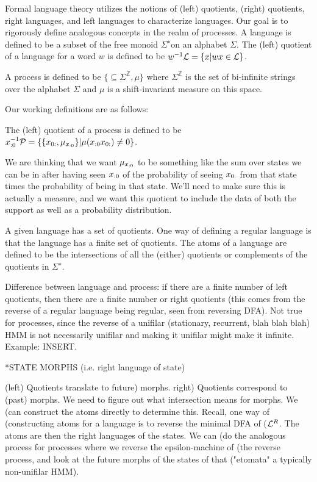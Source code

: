 \documentclass[prl,twocolumn,showpacs,superscriptaddress,preprintnumbers,floatfix]{revtex4-1}
\theoremstyle{plain}    \newtheorem{Lem}{Lemma}
\theoremstyle{plain}    \newtheorem*{ProLem}{Proof}
\theoremstyle{plain}    \newtheorem{Cor}{Corollary}
\theoremstyle{plain}    \newtheorem*{ProCor}{Proof}
\theoremstyle{plain}    \newtheorem{The}{Theorem}
\theoremstyle{plain}    \newtheorem*{ProThe}{Proof}
\theoremstyle{plain}    \newtheorem{Prop}{Proposition}
\theoremstyle{plain}    \newtheorem*{ProProp}{Proof}
\theoremstyle{plain}    \newtheorem*{Conj}{Conjecture}
\theoremstyle{plain}    \newtheorem*{Rem}{Remark}
\theoremstyle{plain}    \newtheorem{Def}{Definition}
\theoremstyle{plain}    \newtheorem*{Not}{Notation}
\begin{document}
Formal language theory utilizes the notions of (left) quotients, (right)
quotients, right languages, and left languages to characterize languages. Our
goal is to rigorously define analogous concepts in the realm of processes. A
language \Language is defined to be a subset of the free monoid
$\Sigma^{\star}$on an alphabet $\Sigma$. The (left) quotient of a language
\Language for a word $w$ is defined to be $w^{-1}\mathcal{L} = \{ x | wx \in
\mathcal{L} \}$.

A process \Process is defined to be $\{\subseteq \Sigma^{\mathbb{Z}}, \mu\}$
where $\Sigma^{\mathbb{Z}}$ is the set of bi-infinite strings over the alphabet
$\Sigma$ and $\mu$ is a shift-invariant measure on this space.

Our working definitions are as follows:

The (left) quotient of a process \Process is defined to be ${x}_{:0}^{-1} \mathcal{P} =
\{ \{ {x}_{0:}, \mu_{{x}_{:0}} \} | \mu({x}_{:0} {x}_{0:}) \neq 0 \}$.

We are thinking that we want $\mu_{{x}_{:0}}$ to be something like the sum over
states we can be in after having seen ${x}_{:0}$ of the probability of seeing
${x}_{0:}$ from that state times the probability of being in that state.
We'll need to make sure this is actually a measure, and we want this quotient to
include the data of both the support as well as a probability distribution.

A given language \Language has a set of quotients.  One way of defining a
regular language is that the language has a finite set of quotients.  The atoms
of a language are defined to be the intersections of all the (either) quotients
or complements of the quotients in $\Sigma^{\star}$.

Difference between language and process: if there are a finite number of left
quotients, then there are a finite number or right quotients (this comes from
the reverse of a regular language being regular, seen from reversing DFA).  Not
true for processes, since the reverse of a unifilar (stationary, recurrent, blah
blah blah) HMM is not necessarily unifilar and making it unifilar might make it
infinite. Example: INSERT.

*STATE MORPHS (i.e. right language of state)

(left) Quotients translate to future) morphs. right) Quotients correspond to
(past) morphs.  We need to figure out what intersection means for morphs.  We
(can construct the atoms directly to determine this.  Recall, one way of
(constructing atoms for a language \Language is to reverse the minimal DFA of
($\mathcal{L}^{R}$.  The atoms are then the right languages of the states. We can
(do the analogous process for processes where we reverse the epsilon-machine of
(the reverse process, and look at the future morphs of the states of that
("etomata" a typically non-unifilar HMM).
\end{document}
